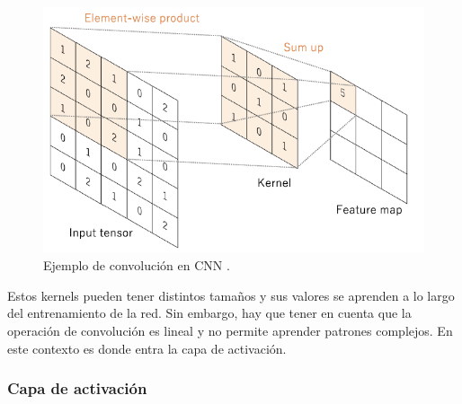 
\begin{figure}[h]
	\centering
	\includegraphics[scale=0.75]{imagenes/cap2/convolution.png}
	\caption{Ejemplo de convolución en CNN \cite{40}.}
	\label{fig6}
\end{figure}

Estos kernels pueden tener distintos tamaños y sus valores se aprenden a lo largo del entrenamiento de la red. Sin embargo, hay que tener en cuenta que la operación de convolución es lineal y no permite aprender patrones complejos. En este contexto es donde entra la capa de activación.

\subsubsection*{Capa de activación}

